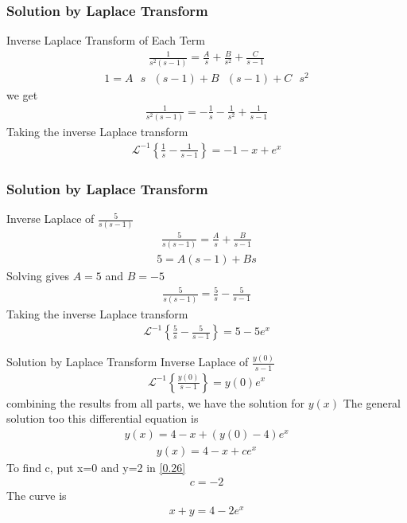 \documentclass{beamer}
\begin{document}
\begin{frame}
\frametitle{Solution by Laplace Transform}
Inverse Laplace Transform of Each Term
\begin{align}
    \frac{1}{s^2 (s - 1)} = \frac{A}{s} + \frac{B}{s^2} + \frac{C}{s - 1}
\end{align}
\begin{align}
    1 = A\text{ } s\text{ } (s - 1) + B \text{ }(s - 1) + C \text{ }s^2
\end{align}
we get
\begin{align}
    \frac{1}{s^2 (s - 1)} = -\frac{1}{s} -\frac{1}{s^2} + \frac{1}{s - 1}
\end{align}
Taking the inverse Laplace transform
\begin{align}
    \mathcal{L}^{-1}\left\{ \frac{1}{s} - \frac{1}{s - 1} \right\} = -1 - x + e^x
\end{align}
\end{frame}
\begin{frame}
\frametitle{Solution by Laplace Transform}
Inverse Laplace of \( \frac{5}{s (s - 1)} \)
\begin{align}
    \frac{5}{s (s - 1)} = \frac{A}{s} + \frac{B}{s - 1}
\end{align}
\begin{align}
    5 = A (s - 1) + B s
\end{align}
Solving gives \( A = 5 \) and \( B = -5 \)
\begin{align}
    \frac{5}{s (s - 1)} = \frac{5}{s} - \frac{5}{s - 1}
\end{align}
Taking the inverse Laplace transform
\begin{align}
    \mathcal{L}^{-1}\left\{ \frac{5}{s} - \frac{5}{s - 1} \right\} = 5 - 5 e^x
\end{align}

\end{frame}
\begin{frame}{Solution by Laplace Transform}
Inverse Laplace of \( \frac{y(0)}{s - 1} \)
\begin{align}
    \mathcal{L}^{-1}\left\{ \frac{y(0)}{s - 1} \right\} = y(0) e^x
\end{align}
combining the results from all parts, we have the solution for $y(x)$
The general solution too this differential equation is 
\begin{align}
    y(x) = 4 - x + (y(0) - 4) e^x 
\end{align}
\begin{align}
     y(x) = 4 - x + c  e^x
    \label{0.26}
\end{align}
To find c, put x=0 and y=2 in \ref{0.26}
\begin{align}
    c = -2  
\end{align}
The curve is 
\begin{align}
   x+y = 4 -2e^x
\end{align}
\end{frame}
\end{document}
